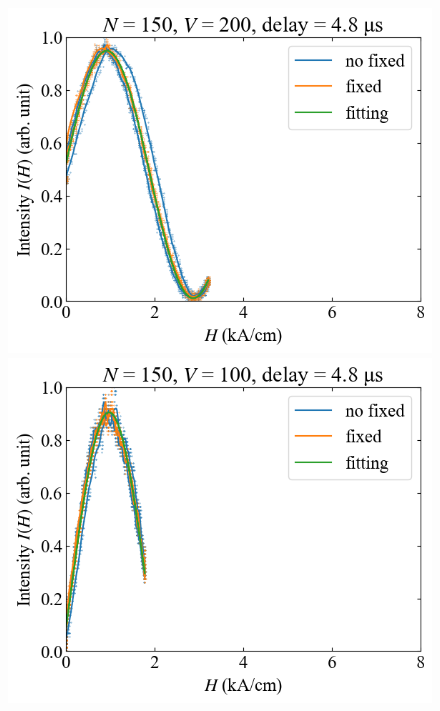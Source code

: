 \documentclass[9pt,dvipdfmx,a4paper]{jsarticle}
\begin{document}
\begin{figure}[H]
\begin{minipage}[t]{0.24\columnwidth}
    \end{minipage}
    \hfill
    \begin{minipage}[t]{0.24\columnwidth}
        \centering
        \includegraphics[width = \columnwidth]{xy/24.png}
    \end{minipage}
    \hfill
    \begin{minipage}[t]{0.24\columnwidth}
        \centering
        \includegraphics[width = \columnwidth]{xy/25.png}
    \end{minipage}
\end{figure}
\clearpage
\fi
\end{document}
